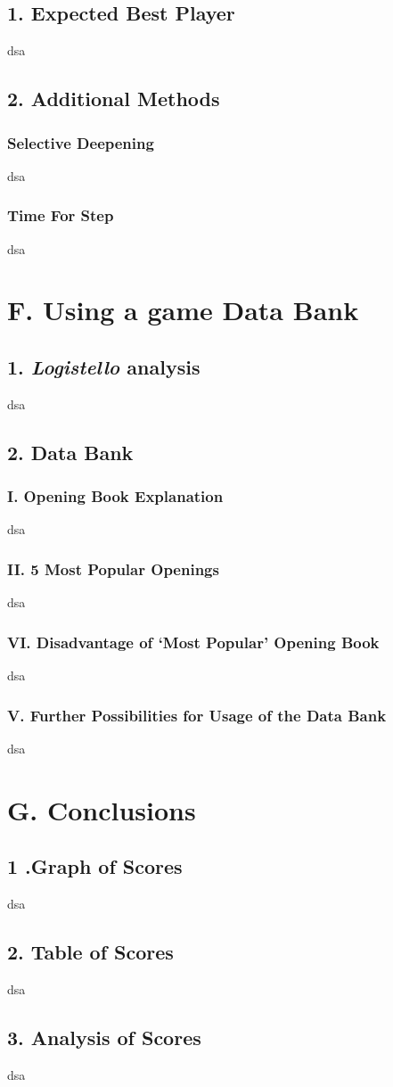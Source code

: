 \documentclass{article}
\begin{document}
\subsection*{1. Expected Best Player}
dsa

\subsection*{2. Additional Methods}
\subsubsection*{Selective Deepening}
dsa

\subsubsection*{Time For Step}
dsa

\section*{F. Using a game Data Bank}
\subsection*{1. \emph{Logistello} analysis}
dsa

\subsection*{2. Data Bank}
\subsubsection*{I. Opening Book Explanation}
dsa

\subsubsection*{II. 5 Most Popular Openings}
dsa

\subsubsection*{VI. Disadvantage of `Most Popular' Opening Book}
dsa

\subsubsection*{V. Further Possibilities for Usage of the Data Bank}
dsa

\section*{G. Conclusions}
\subsection*{1 .Graph of Scores}
dsa

\subsection*{2. Table of Scores}
dsa

\subsection*{3. Analysis of Scores}
dsa
\end{document}
